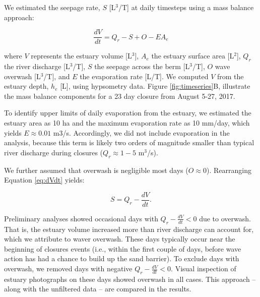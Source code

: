 \documentclass[preprint,12pt,authoryear]{elsarticle}
\begin{document}
We estimated the seepage rate, $S$ [L$^3$/T] at daily timesteps using a mass balance approach:

\begin{equation}
\label{eq:dVdt}
    \frac{dV}{ dt} = Q_r - S + O - E A_e
\end{equation}

\noindent  where $V$  represents the estuary volume [L$^3$], 
$A_e$   the estuary surface area [L$^2$], 
$Q_r$ the river discharge [L$^3$/T],
$S$ the seepage across the berm [L$^3$/T], 
$O$ wave overwash [L$^3$/T], and $E$  the evaporation rate [L/T].
We computed $V$ from the estuary depth, $h_e$ [L], using hypsometry data.
Figure \ref{fig:timeseries}B, illustrate the mass balance components for a 23 day closure from August 5-27, 2017.

To identify upper limits of daily evaporation from the estuary, 
we estimated the estuary area as 10 ha and the maximum  evaporation rate as 10 mm/day, which yields $E \approx 0.01$ m3/s. Accordingly, we did not include evaporation in the analysis, because this term is likely two orders of magnitude smaller than typical river discharge during closures ($Q_r \approx 1-5$ m$^3$/s).  

We further assumed that overwash is negligible most days ($O \approx 0$).  Rearranging Equation \ref{eq:dVdt} yields:

\begin{equation}
\label{eq:S}
    S  = Q_r - \frac{dV}{ dt}.
\end{equation}

Preliminary analyses showed occasional days with  $Q_r - \frac{dV}{ dt} <0$ due to overwash. That is, the estuary volume increased more than river discharge can account for, which we attribute to waver overwash.
These days typically occur near the beginning of closures events (i.e., within the first couple of days, before wave action has had a chance to build up the sand barrier).
To exclude days with overwash, we removed days with negative $ Q_r - \frac{dV}{ dt} < 0$.  Visual inspection of estuary photographs on these days showed overwash in all cases.
This approach -- along with the unfiltered data -- are compared in the results. 

\end{document}
